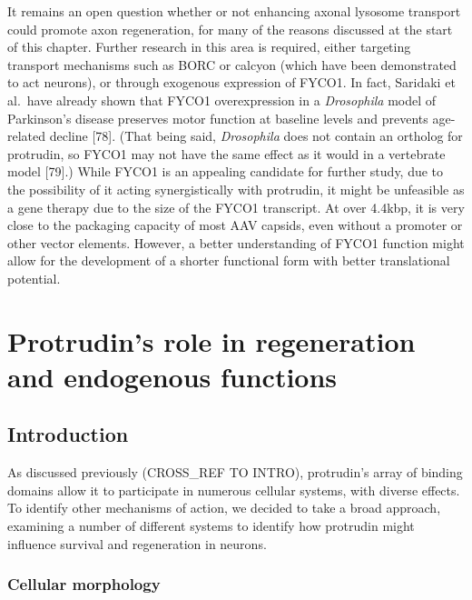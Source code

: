 \documentclass[
  12pt,
  a4paper,
]{book}
\begin{document}
It remains an open question whether or not enhancing axonal lysosome transport could promote axon regeneration, for many of the reasons discussed at the start of this chapter. Further research in this area is required, either targeting transport mechanisms such as BORC or calcyon (which have been demonstrated to act neurons), or through exogenous expression of FYCO1. In fact, Saridaki et al.~have already shown that FYCO1 overexpression in a \emph{Drosophila} model of Parkinson's disease preserves motor function at baseline levels and prevents age-related decline {[}78{]}. (That being said, \emph{Drosophila} does not contain an ortholog for protrudin, so FYCO1 may not have the same effect as it would in a vertebrate model {[}79{]}.) While FYCO1 is an appealing candidate for further study, due to the possibility of it acting synergistically with protrudin, it might be unfeasible as a gene therapy due to the size of the FYCO1 transcript. At over 4.4kbp, it is very close to the packaging capacity of most AAV capsids, even without a promoter or other vector elements. However, a better understanding of FYCO1 function might allow for the development of a shorter functional form with better translational potential.

\hypertarget{protrudins-role-in-regeneration-and-endogenous-functions}{%
\chapter{Protrudin's role in regeneration and endogenous functions}\label{protrudins-role-in-regeneration-and-endogenous-functions}}


\hypertarget{introduction-1}{%
\section{Introduction}\label{introduction-1}}

As discussed previously (CROSS\_REF TO INTRO), protrudin's array of binding domains allow it to participate in numerous cellular systems, with diverse effects. To identify other mechanisms of action, we decided to take a broad approach, examining a number of different systems to identify how protrudin might influence survival and regeneration in neurons.

\hypertarget{cellular-morphology}{%
\subsection{Cellular morphology}\label{cellular-morphology}}
\end{document}

